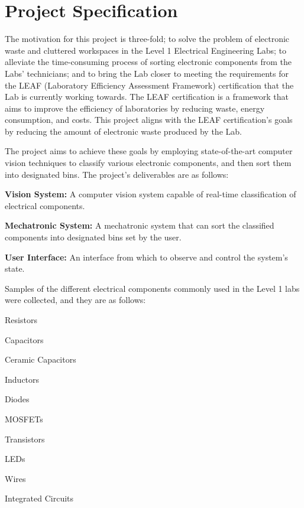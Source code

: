 \section{Project Specification}
\label{sec:project-specification}
The motivation for this project is three-fold; to solve the problem of electronic waste and cluttered workspaces in the Level 1 Electrical Engineering Labs; to alleviate the time-consuming process of sorting electronic components from the Labs' technicians; and to bring the Lab closer to meeting the requirements for the LEAF (Laboratory Efficiency Assessment Framework) certification \cite{leaf} that the Lab is currently working towards. The LEAF certification is a framework that aims to improve the efficiency of laboratories by reducing waste, energy consumption, and costs.
This project aligns with the LEAF certification's goals by reducing the amount of electronic waste produced by the Lab.

The project aims to achieve these goals by employing state-of-the-art computer vision techniques to classify various electronic components, and then sort them into designated bins. The project's deliverables are as follows:
\begin{mylist}
  \item \textbf{Vision System:} A computer vision system capable of real-time classification of electrical components.
  \item \textbf{Mechatronic System:} A mechatronic system that can sort the classified components into designated bins set by the user.
  \item \textbf{User Interface:} An interface from which to observe and control the system's state.  
\end{mylist} 
\noindent
Samples of the different electrical components commonly used in the Level 1 labs were collected, and they are as follows:
\begin{multicols}{2}
  \begin{mylist}
    \item Resistors
    \item Capacitors
    \item Ceramic Capacitors
    \item Inductors
    \item Diodes
    \item MOSFETs
    \item Transistors
    \item LEDs
    \item Wires
    \item Integrated Circuits
  \end{mylist}
\end{multicols}


